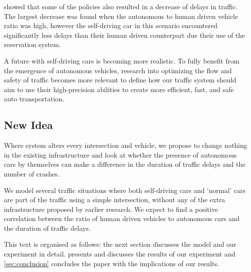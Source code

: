 \textcite{dresner2007sharing} showed that some of the policies also resulted in a decrease of delays in traffic. The largest decrease was found when the autonomous to human driven vehicle ratio was high, however the self-driving car in this scenario encountered significantly less delays than their human driven counterpart due their use of the reservation system.

A future with self-driving cars is becoming more realistic. To fully benefit from the emergence of autonomous vehicles, research into optimizing the flow and safety of traffic becomes more relevant to define how our traffic system should aim to use their high-precision abilities to create more efficient, fast, and safe auto transportation.


\subsection{New Idea}
\label{sub:intro:new_idea}	
Where \textcite{dresner2007sharing} system alters every intersection and vehicle, we propose to change nothing in the existing infrastructure and look at whether the presence of autonomous cars by themselves can make a difference in the duration of traffic delays and the number of crashes. 

We model several traffic situations where both self-driving cars and `normal' cars are part of the traffic using a simple intersection, without any of the extra infrastructure proposed by earlier research. We expect to find a positive correlation between the ratio of human driven vehicles to autonomous cars and the duration of traffic delays.

This text is organised as follows: the next section discusses the model and our experiment in detail.  presents and discusses the results of our experiment and \cref{sec:conclusion} concludes the paper with the implications of our results.